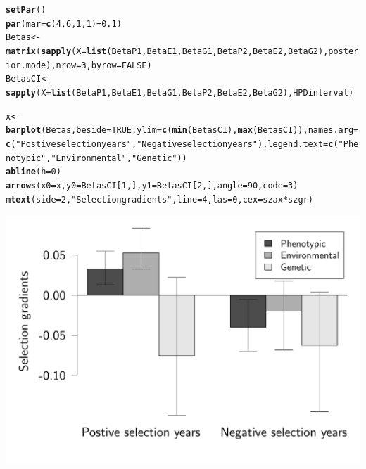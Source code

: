 \documentclass{article}\usepackage[]{graphicx}\usepackage[]{color}
\makeatletter
\def\maxwidth{ %
  \ifdim\Gin@nat@width>\linewidth
    \linewidth
  \else
    \Gin@nat@width
  \fi
}
\newcommand{\hlnum}[1]{\textcolor[rgb]{0.686,0.059,0.569}{#1}}%
\newcommand{\hlstr}[1]{\textcolor[rgb]{0.192,0.494,0.8}{#1}}%
\newcommand{\hlopt}[1]{\textcolor[rgb]{0,0,0}{#1}}%
\newcommand{\hlstd}[1]{\textcolor[rgb]{0.345,0.345,0.345}{#1}}%
\newcommand{\hlkwb}[1]{\textcolor[rgb]{0.69,0.353,0.396}{#1}}%
\newcommand{\hlkwc}[1]{\textcolor[rgb]{0.333,0.667,0.333}{#1}}%
\newcommand{\hlkwd}[1]{\textcolor[rgb]{0.737,0.353,0.396}{\textbf{#1}}}%
\newenvironment{kframe}{%
 \def\at@end@of@kframe{}%
 \ifinner\ifhmode%
  \def\at@end@of@kframe{\end{minipage}}%
  \begin{minipage}{\columnwidth}%
 \fi\fi%
 \def\FrameCommand##1{\hskip\@totalleftmargin \hskip-\fboxsep
 \colorbox{shadecolor}{##1}\hskip-\fboxsep
     \hskip-\linewidth \hskip-\@totalleftmargin \hskip\columnwidth}%
 \MakeFramed {\advance\hsize-\width
   \@totalleftmargin\z@ \linewidth\hsize
   \@setminipage}}%
 {\par\unskip\endMakeFramed%
 \at@end@of@kframe}
\newenvironment{knitrout}{}{} %
\makeatother
\begin{document}
\begin{knitrout}
\color{fgcolor}\begin{kframe}
\begin{alltt}
\hlkwd{setPar}\hlstd{()}
\hlkwd{par}\hlstd{(}\hlkwc{mar}\hlstd{=}\hlkwd{c}\hlstd{(}\hlnum{4}\hlstd{,} \hlnum{6}\hlstd{,} \hlnum{1}\hlstd{,} \hlnum{1}\hlstd{)} \hlopt{+} \hlnum{0.1}\hlstd{)}
\hlstd{Betas} \hlkwb{<-} \hlkwd{matrix}\hlstd{(}\hlkwd{sapply}\hlstd{(}\hlkwc{X} \hlstd{=} \hlkwd{list}\hlstd{(BetaP1, BetaE1, BetaG1, BetaP2, BetaE2, BetaG2), posterior.mode),}\hlkwc{nrow} \hlstd{=}\hlnum{3}\hlstd{,} \hlkwc{byrow}\hlstd{=}\hlnum{FALSE}\hlstd{)}
\hlstd{BetasCI} \hlkwb{<-} \hlkwd{sapply}\hlstd{(}\hlkwc{X} \hlstd{=} \hlkwd{list}\hlstd{(BetaP1, BetaE1, BetaG1, BetaP2, BetaE2, BetaG2), HPDinterval)}

\hlstd{x} \hlkwb{<-} \hlkwd{barplot}\hlstd{(Betas,} \hlkwc{beside}\hlstd{=}\hlnum{TRUE}\hlstd{,} \hlkwc{ylim}\hlstd{=}\hlkwd{c}\hlstd{(}\hlkwd{min}\hlstd{(BetasCI),}\hlkwd{max}\hlstd{(BetasCI)),}\hlkwc{names.arg} \hlstd{=} \hlkwd{c}\hlstd{(}\hlstr{"Postive selection years"}\hlstd{,}\hlstr{"Negative selection years"}\hlstd{),} \hlkwc{legend.text} \hlstd{=} \hlkwd{c}\hlstd{(}\hlstr{"Phenotypic"}\hlstd{,}\hlstr{"Environmental"}\hlstd{,}\hlstr{"Genetic"}\hlstd{))}
\hlkwd{abline}\hlstd{(}\hlkwc{h}\hlstd{=}\hlnum{0}\hlstd{)}
\hlkwd{arrows}\hlstd{(}\hlkwc{x0} \hlstd{= x,} \hlkwc{y0}\hlstd{=BetasCI[}\hlnum{1}\hlstd{,],}\hlkwc{y1}\hlstd{=BetasCI[}\hlnum{2}\hlstd{,],}\hlkwc{angle} \hlstd{=} \hlnum{90}\hlstd{,}\hlkwc{code} \hlstd{=} \hlnum{3}\hlstd{)}
\hlkwd{mtext}\hlstd{(}\hlkwc{side}\hlstd{=}\hlnum{2}\hlstd{,} \hlstr{"Selection gradients"}\hlstd{,} \hlkwc{line}\hlstd{=}\hlnum{4}\hlstd{,} \hlkwc{las}\hlstd{=}\hlnum{0}\hlstd{,} \hlkwc{cex}\hlstd{=szax}\hlopt{*}\hlstd{szgr)}
\end{alltt}
\end{kframe}
\includegraphics[width=\maxwidth]{figure/Betas-1} 

\end{knitrout}
\end{document}
